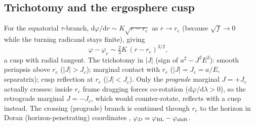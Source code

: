 \documentclass[
    aps, prd, twocolumn, superscriptaddress,
    showpacs, nofootinbib, floatfix
]{revtex4-2}
\newcommand{\re}{r_{e}}
\newcommand{\Jc}{J_{c}}
\newcommand{\dd}{\mathrm{d}}
\begin{document}
\subsection{Trichotomy and the ergosphere cusp}
\label{sec:trichotomy}
For the equatorial $\tau$-branch, $\dd\varphi/\dd r\sim K\sqrt{r-\re}$ as
$r\to\re$ (because $\sqrt f\to0$ while the turning radicand stays finite),
giving
\begin{equation}
    \varphi-\varphi_e \sim \tfrac{2}{3}K\,(r-\re)^{3/2},
    \label{eq:cusp}
\end{equation}
a cusp with radial tangent. The trichotomy in $|J|$ (sign of $a^2-J^2E^2$):
smooth periapsis above $\re$ ($|J|>\Jc$); marginal contact with $\re$
($|J|=\Jc=a/E$, separatrix); cusp reflection at $\re$ ($|J|<\Jc$). Only the
\emph{prograde} marginal $J=+\Jc$ actually crosses: inside $\re$ frame dragging
forces co-rotation ($\dd\varphi/\dd\lambda>0$), so the retrograde marginal
$J=-\Jc$, which would counter-rotate, reflects with a cusp instead. The crossing
(prograde) branch is continued through $\re$ to the horizon in Doran
(horizon-penetrating) coordinates
\cite{Doran2000,Natario2009,MartelPoisson2001},
$\varphi_D=\varphi_{\rm BL}-\varphi_{\rm shift}$.
\end{document}
